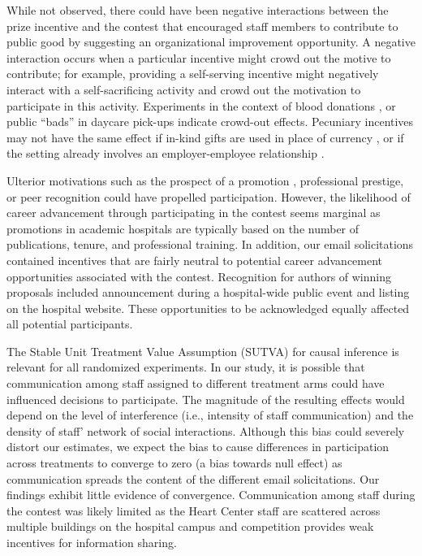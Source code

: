 \documentclass[12pt, titlepage]{article}
\begin{document}
While not observed, there could have been negative interactions between
the prize incentive and the contest that encouraged staff members to
contribute to public good by suggesting an organizational improvement
opportunity. A negative interaction occurs when a particular incentive
might crowd out the motive to contribute; for example, providing a
self-serving incentive might negatively interact with a self-sacrificing
activity and crowd out the motivation to participate in this activity.
Experiments in the context of blood donations
\citep{lacetera2013economic, lacetera2014rewarding}, or public ``bads''
in daycare pick-ups \citep{gneezy2000fine} indicate crowd-out effects.
Pecuniary incentives may not have the same effect if in-kind gifts are
used in place of currency \citep[e.g.,][]{kube2012currency}, or if the
setting already involves an employer-employee relationship
\citep[e.g,][]{fehr1998gift}.

Ulterior motivations such as the prospect of a promotion
\citep{baker1994internal, gibbs1995incentive}, professional prestige, or
peer recognition \citep{kosfeld2011getting, blanes2011tournaments} could
have propelled participation. However, the likelihood of career
advancement through participating in the contest seems marginal as
promotions in academic hospitals are typically based on the number of
publications, tenure, and professional training. In addition, our email
solicitations contained incentives that are fairly neutral to potential
career advancement opportunities associated with the contest.
Recognition for authors of winning proposals included announcement
during a hospital-wide public event and listing on the hospital website.
These opportunities to be acknowledged equally affected all potential
participants.

The Stable Unit Treatment Value Assumption (SUTVA) for causal inference
\citep{rubin1974estimating} is relevant for all randomized experiments.
In our study, it is possible that communication among staff assigned to
different treatment arms could have influenced decisions to participate.
The magnitude of the resulting effects would depend on the level of
interference (i.e., intensity of staff communication) and the density of
staff' network of social interactions. Although this bias could severely
distort our estimates, we expect the bias to cause differences in
participation across treatments to converge to zero (a bias towards null
effect) as communication spreads the content of the different email
solicitations. Our findings exhibit little evidence of convergence.
Communication among staff during the contest was likely limited as the
Heart Center staff are scattered across multiple buildings on the
hospital campus and competition provides weak incentives for information
sharing.
\end{document}
